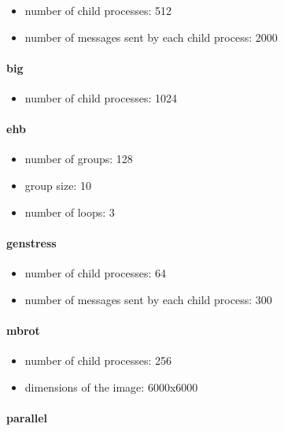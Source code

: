 \begin{itemize}
  \item number of child processes: 512
  \item number of messages sent by each child process: 2000
\end{itemize}

\paragraph{big} 
\begin{itemize}
  \item number of child processes: 1024
\end{itemize}

\paragraph{ehb}  

\begin{itemize}
  \item number of groups: 128
  \item group size: 10
  \item number of loops: 3
\end{itemize}

\paragraph{genstress}  

\begin{itemize}
  \item number of child processes: 64
  \item number of messages sent by each child process: 300
\end{itemize}


\paragraph{mbrot} 

\begin{itemize}
  \item number of child processes: 256
  \item dimensions of the image: 6000x6000
\end{itemize}


\paragraph{parallel}

